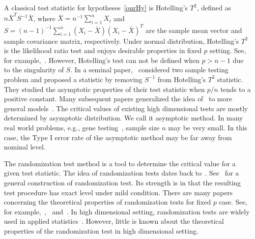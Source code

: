 \documentclass[review]{elsarticle}
\newcommand{\BP}{\mathbf{P}}
\theoremstyle{plain}
\theoremstyle{definition}
\theoremstyle{remark}
\begin{document}
A classical test statistic for hypotheses~\eqref{ourHy} is Hotelling's $T^2$, defined as
    $
    n\bar{X}^T S^{-1}\bar{X}
    $,
where $\bar{X}=n^{-1}\sum_{i=1}^n X_i$ and $S=(n-1)^{-1}\sum_{i=1}^n (X_i-\bar{X}) (X_i-\bar{X})^T$ are the sample mean vector and sample covariance matrix, respectively.
Under normal distribution, Hotelling's $T^2$ is the likelihood ratio test and enjoys desirable properties in fixed $p$ setting. See, for example,~\citet{andersonMultivariate}.
However, Hotelling's test can not be defined when $p>n-1$ due to the singularity of $S$.
In a seminal paper,~\citet{Bai1996Efiect} considered two sample testing problem and proposed a statistic by removing $S^{-1}$ from Hotelling's $T^2$ statistic.
They studied the asymptotic properties of their test statistic when $p/n$ tends to a positive constant.
Many subsequent papers generalized the idea of~\citet{Bai1996Efiect} to more general models~\citep{Srivastava2008A,Chen2010A,Wang2015A}.
The critical values of existing high dimensional tests are mostly determined by asymptotic distribution. 
We call it asymptotic method.
 In many real world problems, e.g., gene testing~\citep{efron2007on}, sample size $n$ may be very small.
In this case, the Type I error rate of the asymptotic method may be far away from nominal level. 

The randomization test method is a tool to determine the critical value for a given test statistic.
The idea of randomization tests dates back to~\citet{Fisher}.
See~\citet{Romano1990On} for a general construction of randomization test.
Its strength is in that the resulting test procedure has exact level under mild condition.
There are many papers concerning the theoretical properties of randomization tests for fixed $p$ case.
See, for example,~\citet{Romano1990On},~\citet{Zhu2000N} and~\citet{Chung2016Multivariate}.
In high dimensional setting, randomization tests are widely used in applied statistics~\citep{Subramanian2005,efron2007on,Ko2016}.
However, little is known about the theoretical properties of the randomization test in high dimensional setting.
\end{document}
